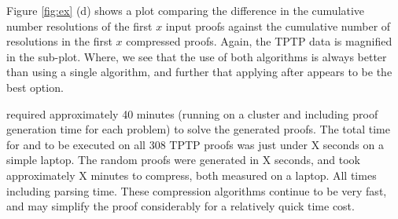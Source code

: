 {Figure \ref{fig:ex} (d) shows a plot comparing the difference in the cumulative number resolutions of the first $x$ input proofs against the cumulative number of resolutions in the first $x$ compressed proofs. Again, the TPTP data is magnified in the sub-plot. Where, we see that the use of both algorithms is always better than using a single algorithm, and further that applying {\FORPI} after {\GFOLU} appears to be the best option.



{\SPASS} required approximately 40 minutes (running on a cluster and including proof generation time for each problem) to solve the generated proofs. The total time for {\GFOLU} and {\FORPI} to be executed on all 308 TPTP proofs was just under X seconds on a simple laptop. The random proofs were generated in X seconds, and took approximately X minutes to compress, both measured on a laptop.
All times including parsing time. These compression algorithms continue to be very fast, and may simplify the proof considerably for a relatively quick time cost.







}
